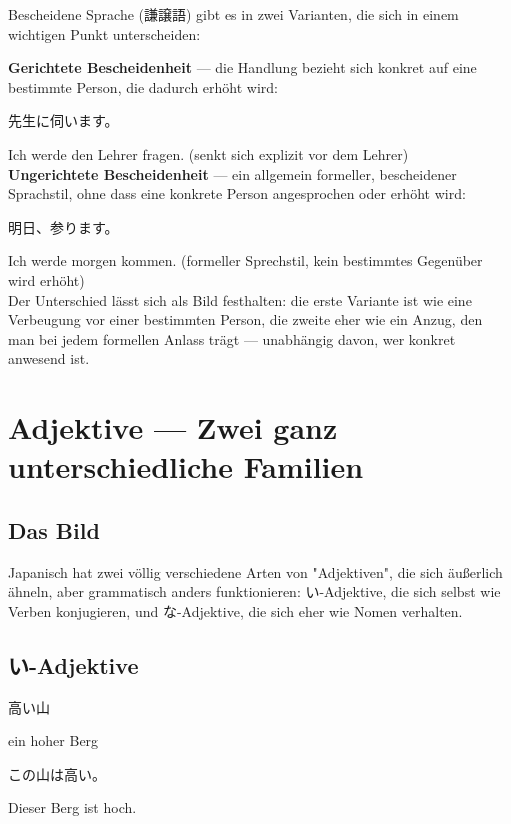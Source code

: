 \documentclass[12pt]{book}
\begin{document}
Bescheidene Sprache (謙譲語) gibt es in zwei Varianten, die sich in einem wichtigen Punkt unterscheiden:

\textbf{Gerichtete Bescheidenheit} — die Handlung bezieht sich konkret auf eine bestimmte Person, die dadurch erhöht wird:
\par\quad 先生に伺います。\\
\par\quad Ich werde den Lehrer fragen. (senkt sich explizit vor dem Lehrer)\\

\textbf{Ungerichtete Bescheidenheit} — ein allgemein formeller, bescheidener Sprachstil, ohne dass eine konkrete Person angesprochen oder erhöht wird:
\par\quad 明日、参ります。\\
\par\quad Ich werde morgen kommen. (formeller Sprechstil, kein bestimmtes Gegenüber wird erhöht)\\

Der Unterschied lässt sich als Bild festhalten: die erste Variante ist wie eine Verbeugung vor einer bestimmten Person, die zweite eher wie ein Anzug, den man bei jedem formellen Anlass trägt — unabhängig davon, wer konkret anwesend ist.


\chapter{Adjektive — Zwei ganz unterschiedliche Familien}

\section*{Das Bild}

Japanisch hat zwei völlig verschiedene Arten von "Adjektiven", die sich äußerlich ähneln, aber grammatisch anders funktionieren: い-Adjektive, die sich selbst wie Verben konjugieren, und な-Adjektive, die sich eher wie Nomen verhalten.

\section*{い-Adjektive}

\par\quad 高い山\\
\par\quad ein hoher Berg\\

\par\quad この山は高い。\\
\par\quad Dieser Berg ist hoch.\\
\end{document}
